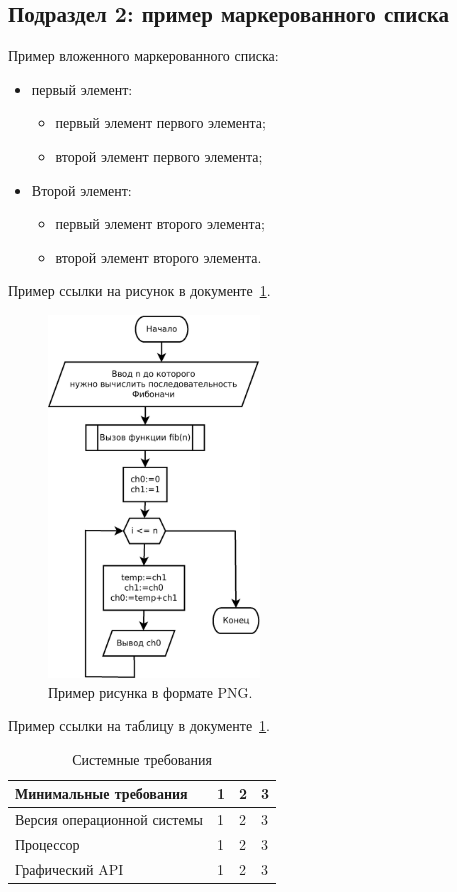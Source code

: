 \subsection{\label{subsec:ch01/sec02/sub02}Подраздел 2: пример маркерованного списка}

Пример вложенного маркерованного списка:
\begin{itemize}
\item первый элемент:
\begin{itemize}
\item первый элемент первого элемента;
\item второй элемент первого элемента;
\end{itemize}
\item Второй элемент:
\begin{itemize}
\item первый элемент второго элемента;
\item второй элемент второго элемента.
\end{itemize}
\end{itemize}

Пример ссылки на рисунок в документе~\ref{fig:example01}.
\begin{figure}[h]
    \centering
    \includegraphics[width=0.5\textwidth]{./images/fibonacci.png}
    \caption{\centering\label{fig:example01}Пример рисунка в формате PNG.}
\end{figure}

Пример ссылки на таблицу в документе~\ref{tab:example01}.
\begin{table}[H]
\caption{\centering\label{tab:example01}Системные требования}
\begin{tabular}{|p{3 cm}|p{3 cm}|p{3 cm}|p{5 cm}|}
\hline
Минимальные требования & 1 & 2 & 3 \\ \hline
Версия операционной системы & 1 & 2 & 3 \\ \hline
Процессор & 1 & 2 & 3 \\ \hline
Графический API & 1 & 2 & 3 \\ \hline
\end{tabular}
\end{table}

